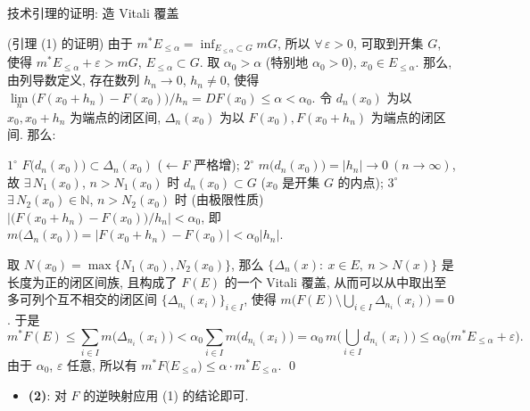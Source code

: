 \begin{frame}{技术引理的证明: 造 Vitali 覆盖}

\startproof[bg=yellow, fg=red](引理 (1) 的证明)
由于 $m^* E_{\leqslant \alpha} = \inf_{E_{\leqslant \alpha} \subset G} m G$,
所以 $\forall\, \varepsilon > 0$, 可取到开集 $G$, 使得
$m^* E_{\leqslant \alpha} + \varepsilon > m G$, $E_{\leqslant \alpha} \subset G$.
取 $\alpha_0 > \alpha$ (特别地 $\alpha_0 > 0$), $x_0 \in E_{\leqslant \alpha}$.
那么, 由列导数定义, 存在数列 $h_n \to 0$, $h_n \neq 0$, 使得
$\lim\limits_{n} \big( F(x_0 + h_n) - F(x_0) \big) / h_n
= D F(x_0) \leqslant \alpha < \alpha_0$.
令 $d_n(x_0)$ 为以 $x_0, x_0 + h_n$ 为端点的闭区间, $\Delta_n(x_0)$ 为以
$F(x_0), F(x_0 + h_n)$ 为端点的闭区间. 那么:

\pause

$1^{\circ}$ $F\big( d_n(x_0) \big) \subset \Delta_n(x_0)$
($\leftarrow F$ 严格增);\quad
$2^{\circ}$ $m \big( d_n(x_0) \big) = |h_n| \to 0\ (n \to \infty)$,
故 $\exists\, N_1(x_0)$, $n > N_1(x_0)$ 时 $d_n(x_0) \subset G$
($x_0$ 是开集 $G$ 的内点);\quad
$3^{\circ}$ $\exists\, N_2(x_0) \in \mathbb{N}$, $n > N_2(x_0)$ 时 (由极限性质)
$\big| \big( F(x_0 + h_n) - F(x_0) \big) / h_n \big| < \alpha_0$,
即 $m \big( \Delta_n(x_0) \big) = |F(x_0 + h_n) - F(x_0)| < \alpha_0 |h_n|$.

\pause

取 $N(x_0) = \max \{ N_1(x_0), N_2(x_0) \}$, 那么
$\{ \Delta_n(x):\ x \in E,\ n > N(x) \}$ 是长度为正的闭区间族, 且构成了 $F(E)$
的一个 Vitali 覆盖, 从而可以从中取出至多可列个互不相交的闭区间
$\{ \Delta_{n_i}(x_i) \}_{i \in I}$, 使得
$m \Big( F(E) \setminus \bigcup_{i \in I} \Delta_{n_i}(x_i) \Big) = 0$.
于是
\[
m^* F(E)
\leqslant \sum_{i \in I} m \big( \Delta_{n_i}(x_i) \big)
< \alpha_0 \sum_{i \in I} m \big( d_{n_i}(x_i) \big)
= \alpha_0 \, m \Big( \bigcup_{i \in I} d_{n_i}(x_i) \Big)
\leqslant \alpha_0 \big( m^* E_{\leqslant \alpha} + \varepsilon \big) .
\]
由于 $\alpha_0$, $\varepsilon$ 任意, 所以有
$m^* F\big( E_{\leqslant \alpha} \big) \leqslant \alpha \cdot m^* E_{\leqslant \alpha}$.
\qed

\pause

\begin{itemize}
\item \textbf{(2)}: 对 $F$ 的逆映射应用 (1) 的结论即可.
\end{itemize}

\end{frame}


